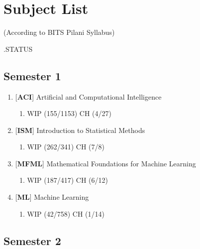 \chapter*{Subject List}

\begin{center}
(According to BITS Pilani Syllabus)
\end{center}

.\hfill STATUS

\section*{Semester 1}
\begin{enumerate}[series=sublist]
    \item {[\textbf{ACI}]} Artificial and Computational Intelligence
        \begin{enumerate}
            \item {}
            \hfill WIP (155/1153) CH (4/27)
        \end{enumerate}

    \item {[\textbf{ISM}]} Introduction to Statistical Methods
        \begin{enumerate}
            \item {}
            \hfill WIP (262/341) CH (7/8)
        \end{enumerate}

    \item {[\textbf{MFML}]} Mathematical Foundations for Machine Learning
        \begin{enumerate}
            \item {}
            \hfill WIP (187/417) CH (6/12)
        \end{enumerate}

    \item {[\textbf{ML}]} Machine Learning
        \begin{enumerate}
            \item {}
            \hfill WIP (42/758) CH (1/14)
        \end{enumerate}
\end{enumerate}


\section*{Semester 2}

